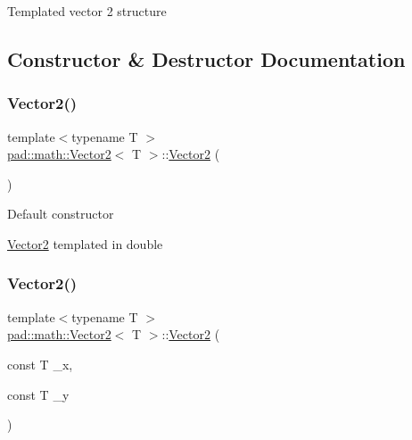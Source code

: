 Templated vector 2 structure 

\subsection{Constructor \& Destructor Documentation}
\mbox{\label{structpad_1_1math_1_1_vector2_afaa3496649b893db8720d87c9dc4f03f}} 
\subsubsection{\texorpdfstring{Vector2()}{Vector2()}\hspace{0.1cm}{\footnotesize\ttfamily [1/5]}}
{\footnotesize\ttfamily template$<$typename T $>$ \\
\mbox{\hyperlink{structpad_1_1math_1_1_vector2}{pad\+::math\+::\+Vector2}}$<$ T $>$\+::\mbox{\hyperlink{structpad_1_1math_1_1_vector2}{Vector2}} (\begin{DoxyParamCaption}{ }\end{DoxyParamCaption})}

Default constructor

\mbox{\hyperlink{structpad_1_1math_1_1_vector2}{Vector2}} templated in double \mbox{\label{structpad_1_1math_1_1_vector2_ab21c64ccea2b5c873a9edf99c452e5a8}} 
\subsubsection{\texorpdfstring{Vector2()}{Vector2()}\hspace{0.1cm}{\footnotesize\ttfamily [2/5]}}
{\footnotesize\ttfamily template$<$typename T $>$ \\
\mbox{\hyperlink{structpad_1_1math_1_1_vector2}{pad\+::math\+::\+Vector2}}$<$ T $>$\+::\mbox{\hyperlink{structpad_1_1math_1_1_vector2}{Vector2}} (\begin{DoxyParamCaption}\item[{const T}]{\+\_\+x,  }\item[{const T}]{\+\_\+y }\end{DoxyParamCaption})}


